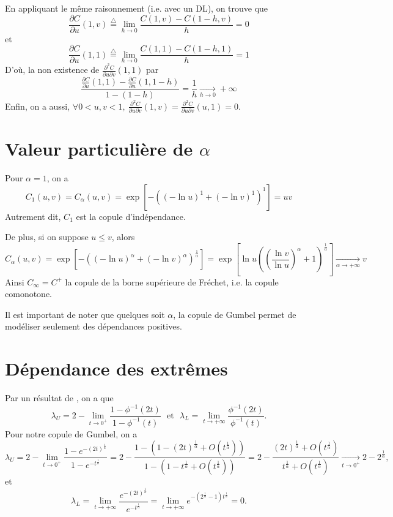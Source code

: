 \documentclass[11pt,a4paper]{article}
\newcommand{\txtm}[1]{\textrm{~~#1~~}}
\begin{document}
\begin{small}
En appliquant le m\^eme raisonnement (i.e. avec un DL), on trouve que 
$$
\frac{\partial C}{\partial u }(1,v) \stackrel{\triangle}{=} \underset{h\rightarrow 0}{\lim} \frac{C(1,v)-C(1-h,v)}{h} = 0
$$
et
$$
\frac{\partial C}{\partial u }(1,1) \stackrel{\triangle}{=} \underset{h\rightarrow 0}{\lim} \frac{C(1,1)-C(1-h,1)}{h} = 1
$$
D'o\`u, la non existence de  $\frac{\partial^2 C}{\partial u \partial v}(1,1)$ par
$$
\frac{\frac{\partial C}{\partial u }(1,1)-\frac{\partial C}{\partial u }(1,1-h)}{1-(1-h)} =\frac{1}{h}\underset{h\rightarrow 0}{\longrightarrow} +\infty
$$
Enfin, on a aussi, $\forall 0<u,v<1,~\frac{\partial^2 C}{\partial u \partial v}(1,v) = \frac{\partial^2 C}{\partial u \partial v}(u,1)=0$.

\section{Valeur particuli\`ere de $\alpha$}
\label{parametreDemo}
Pour $\alpha=1$, on a 
$$
C_1(u,v) = C_\alpha\left(u,v\right)=\exp\left[-\left(\left(-\ln u\right)^1+\left(-\ln v\right)^1\right)^1\right] = uv
$$
Autrement dit, $C_1$ est la copule d'ind\'ependance.

De plus, si on suppose $u\leq v$, alors
$$
C_\alpha(u,v) = \exp\left[-\left(\left(-\ln u\right)^\alpha+\left(-\ln v\right)^\alpha\right)^{\frac{1}{\alpha}}\right] 
      =  \exp \left[  \ln u \left(\left(\frac{\ln v}{\ln u}\right)^\alpha+1\right)^{\frac{1}{\alpha}}\right] 
      \underset{\alpha\rightarrow +\infty}{\longrightarrow} v
$$
Ainsi $C_\infty = C^+$ la copule de la borne sup\'erieure de Fr\'echet, i.e. la copule comonotone.

Il est important de noter que quelques soit $\alpha$, la copule de Gumbel permet de mod\'eliser seulement des d\'ependances positives.


\section{D\'ependance des extr\^emes}
\label{extreme}
Par un r\'esultat de \cite{nelsen}, on a que 
$$\lambda_U =2-\underset{t\rightarrow0^+}{\lim} \frac{1-\phi^{-1}(2t) }{1-\phi^{-1}(t)} \txtm{et}
\lambda_L = \underset{t\rightarrow +\infty}{\lim} \frac{\phi^{-1}(2t) }{\phi^{-1}(t)}.
$$
Pour notre copule de Gumbel, on a 
$$
\lambda_U =2-\underset{t\rightarrow0^+}{\lim} \frac{1- e^{-(2t)^\frac{1}{\alpha}} }{1- e^{-t^\frac{1}{\alpha}} }
= 2- \frac{1- \left(1-(2t)^\frac{1}{\alpha}  +O\left(t^\frac{1}{\alpha}\right)\right) }{1- \left(1-t^\frac{1}{\alpha} +O\left(t^\frac{1}{\alpha}\right)\right) }
= 2- \frac{ (2t)^\frac{1}{\alpha}  +O\left(t^\frac{1}{\alpha}\right) }{ t^\frac{1}{\alpha} +O\left(t^\frac{1}{\alpha}\right) }
\underset{t\rightarrow0^+}{\longrightarrow} 2- 2^\frac{1}{\alpha},
$$
et 
$$
\lambda_L = \underset{t\rightarrow +\infty}{\lim} \frac{ e^{-(2t)^\frac{1}{\alpha}}  }{ e^{-t^\frac{1}{\alpha}} }
= \underset{t\rightarrow +\infty}{\lim} e^{ - (2^\frac{1}{\alpha}-1)t^\frac{1}{\alpha} } =0.
$$




\end{small}
\end{document}
